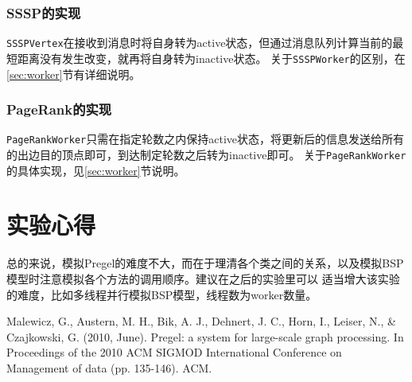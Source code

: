 \documentclass{ML}
\begin{document}
\subsubsection{SSSP的实现}
\texttt{SSSPVertex}在接收到消息时将自身转为active状态，但通过消息队列计算当前的最短距离没有发生改变，就再将自身转为inactive状态。
关于\texttt{SSSPWorker}的区别，在\ref{sec:worker}节有详细说明。
\subsubsection{PageRank的实现}
\texttt{PageRankWorker}只需在指定轮数之内保持active状态，将更新后的信息发送给所有的出边目的顶点即可，到达制定轮数之后转为inactive即可。
关于\texttt{PageRankWorker}的具体实现，见\ref{sec:worker}节说明。
\section{实验心得}
总的来说，模拟Pregel\cite{pregel}的难度不大，而在于理清各个类之间的关系，以及模拟BSP模型时注意模拟各个方法的调用顺序。建议在之后的实验里可以
适当增大该实验的难度，比如多线程并行模拟BSP模型，线程数为worker数量。
\appendix

\begin{thebibliography}{20}
     Malewicz, G., Austern, M. H., Bik, A. J., Dehnert, J. C., Horn, I., Leiser, N., \& Czajkowski, G. (2010, June). Pregel: a system for large-scale graph processing. In Proceedings of the 2010 ACM SIGMOD International Conference on Management of data (pp. 135-146). ACM.
\end{thebibliography}
\end{document}
